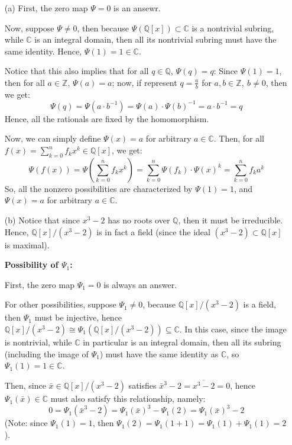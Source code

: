 \documentclass{article}
\begin{document}
\begin{itemize}
    \item[(a)] First, the zero map $\Psi=0$ is an ansewr.
    
    Now, suppose $\Psi\neq 0$, then because $\Psi(\mathbb{Q}[x])\subset \mathbb{C}$ is a nontrivial subring, while $\mathbb{C}$ is an integral domain, then all its nontrivial subring must have the same identity.
    Hence, $\Psi(1)=1\in\mathbb{C}$. 

    Notice that this also implies that for all $q\in\mathbb{Q}$, $\Psi(q)=q$: Since $\Psi(1)=1$, then for all $a\in \mathbb{Z}$, $\Psi(a)=a$;
    now, if represent $q=\frac{a}{b}$ for $a,b\in\mathbb{Z},\ b\neq 0$, then we get:
    $$\Psi(q)=\Psi(a\cdot b^{-1})=\Psi(a)\cdot\Psi(b)^{-1}=a\cdot b^{-1}=q$$
    Hence, all the rationals are fixed by the homomorphism.

    Now, we can simply define $\Psi(x)=a$ for arbitrary $a\in\mathbb{C}$. Then, for all $f(x)=\sum_{k=0}^{n}f_kx^k\in\mathbb{Q}[x]$, we get:
    $$\Psi(f(x))=\Psi\left(\sum_{k=0}^{n}f_kx^k\right)=\sum_{k=0}^{n}\Psi(f_k)\cdot\Psi(x)^k=\sum_{k=0}^{n}f_ka^k$$
    So, all the nonzero possibilities are characterized by $\Psi(1)=1$, and $\Psi(x)=a$ for arbitrary $a\in\mathbb{C}$.

    \hfil

    \item[(b)] Notice that since $x^3-2$ has no roots over $\mathbb{Q}$, then it must be irreducible. Hence, $\mathbb{Q}[x]/(x^3-2)$ is in fact a field (since the ideal $(x^3-2)\subset \mathbb{Q}[x]$ is maximal).
    
    \textbf{Possibility of $\Psi_1$:}
    
    First, the zero map $\Psi_1=0$ is always an answer. 
    
    For other possibilities, suppose $\Psi_1\neq 0$, because $\mathbb{Q}[x]/(x^3-2)$ is a field, then $\Psi_1$ must be injective, hence $\mathbb{Q}[x]/(x^3-2)\cong \Psi_1(\mathbb{Q}[x]/(x^3-2))\subseteq \mathbb{C}$.
    In this case, since the image is nontrivial, while $\mathbb{C}$ in particular is an integral domain, then all its subring (including the image of $\Psi_1$) must have the same identity as $\mathbb{C}$, so $\Psi_1(1)=1\in\mathbb{C}$.

    Then, since $\bar{x}\in \mathbb{Q}[x]/(x^3-2)$ satisfies $\bar{x}^3-2=\overline{x^3-2}=0$, hence $\Psi_1(\bar{x})\in\mathbb{C}$ must also satisfy this relationship, namely:
    $$0=\Psi_1(\bar{x}^3-2)=\Psi_1(\bar{x})^3-\Psi_1(2)=\Psi_1(\bar{x})^3-2$$
    (Note: since $\Psi_1(1)=1$, then $\Psi_1(2)=\Psi_1(1+1)=\Psi_1(1)+\Psi_1(1)=2$).


\end{itemize}
\end{document}
